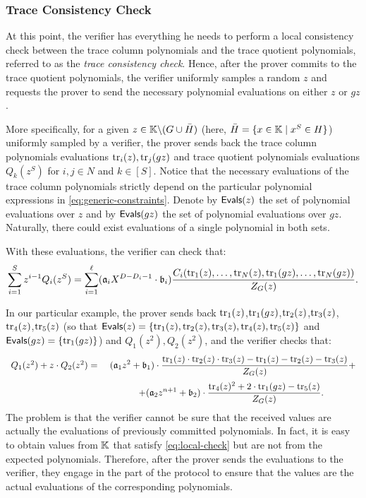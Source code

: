 \subsubsection*{Trace Consistency Check}\label{sec:trace-consistency-check}

At this point, the verifier has everything he needs to perform a local consistency check between the trace column polynomials and the trace quotient polynomials, referred to as the \textit{trace consistency check}. Hence, after the prover commits to the trace quotient polynomials, 
the verifier uniformly samples a random $z$ and requests the prover to send the necessary polynomial evaluations on either $z$ or $gz$. 

More specifically, for a given $z \in \mathbb{K} \backslash (G \cup \bar{H})$ (here, $\bar{H} = \{x \in \mathbb{K} \mid x^S \in H\}$) uniformly sampled by a verifier, the prover sends back the trace column polynomials evaluations $\text{tr}_i(z), \text{tr}_j(gz)$ and trace quotient polynomials evaluations $Q_k(z^S)$ for $i,j \in N$ and $k \in [S]$. Notice that the necessary evaluations of the trace column polynomials strictly depend on the particular polynomial expressions in \eqref{eq:generic-constraints}. Denote by $\textsf{Evals}(z)$ the set of polynomial evaluations over $z$ and by $\textsf{Evals}(gz)$ the set of polynomial evaluations over $gz$. Naturally, there could exist evaluations of a single polynomial in both sets.

With these evaluations, the verifier can check that:
\begin{align}\label{eq:local-check}
\sum_{i=1}^S z^{i-1} Q_i(z^S) = \sum_{i=1}^\ell (\mathfrak{a}_iX^{D-D_i-1} \cdot  \mathfrak{b}_i)\frac{C_i(\text{tr}_1(z), \dots, \text{tr}_N(z), \text{tr}_1(gz), \dots, \text{tr}_N(gz))}{Z_G(z)}.
\end{align}

In our particular example, the prover sends back $\text{tr}_1(z)$,$\text{tr}_1(gz)$,$\text{tr}_2(z)$,$\text{tr}_3(z)$,$\text{tr}_4(z)$,$\text{tr}_5(z)$ (so that $\textsf{Evals}(z) = \{\text{tr}_1(z),\text{tr}_2(z),\text{tr}_3(z),\text{tr}_4(z),\text{tr}_5(z)\}$ and $\textsf{Evals}(gz) = \{\text{tr}_1(gz)\}$) and $Q_1(z^2),Q_2(z^2)$, and the verifier checks that:
\begin{align}
\begin{array}{cc}
Q_1(z^2) + z \cdot Q_2(z^2) = &~ \displaystyle (\mathfrak{a}_1 z^2 + \mathfrak{b}_1) \cdot \frac{\text{tr}_1(z) \cdot \text{tr}_2(z) \cdot \text{tr}_3(z) - \text{tr}_1(z) - \text{tr}_2(z) - \text{tr}_3(z)}{Z_G(z)} + \\[0.4cm]
&+ \displaystyle (\mathfrak{a}_2 z^{n+1} + \mathfrak{b}_2) \cdot \frac{\text{tr}_4(z)^2 + 2\cdot \text{tr}_1(gz) - \text{tr}_5(z)}{Z_G(z)}. 
\end{array}
\end{align}
The problem is that the verifier cannot be sure that the received values are actually the evaluations of previously committed polynomials. In fact, it is easy to obtain values from $\mathbb{K}$ that satisfy \eqref{eq:local-check} but are not from the expected polynomials. Therefore, after the prover sends the evaluations to the verifier, they engage in the part of the protocol to ensure that the values are the actual evaluations of the corresponding polynomials.  




